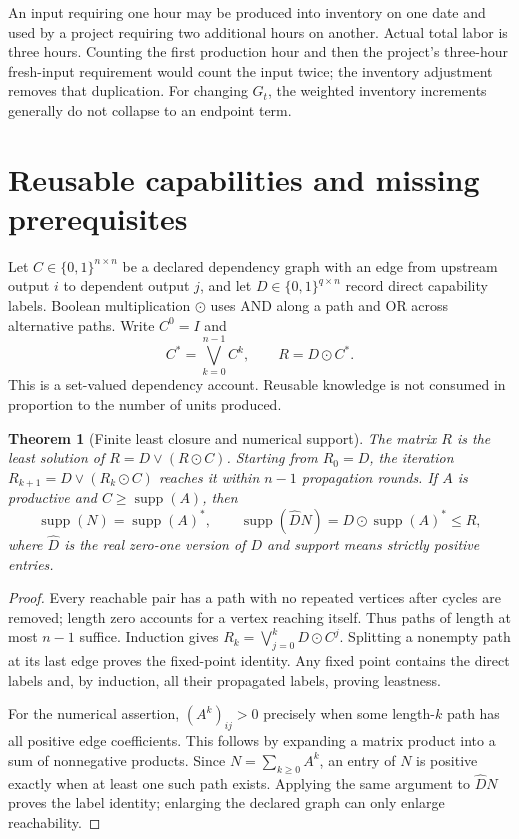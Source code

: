 \documentclass[11pt,a4paper]{article}
\newtheorem{theorem}{Theorem}[section]
\begin{document}
An input requiring one hour may be produced into inventory on one date and used by a project requiring two additional hours on another. Actual total labor is three hours. Counting the first production hour and then the project's three-hour fresh-input requirement would count the input twice; the inventory adjustment removes that duplication. For changing $G_t$, the weighted inventory increments generally do not collapse to an endpoint term.

\section{Reusable capabilities and missing prerequisites}
Let $C\in\{0,1\}^{n\times n}$ be a declared dependency graph with an edge from upstream output $i$ to dependent output $j$, and let $D\in\{0,1\}^{q\times n}$ record direct capability labels. Boolean multiplication $\odot$ uses AND along a path and OR across alternative paths. Write $C^0=I$ and
\begin{equation}
C^*=\bigvee_{k=0}^{n-1}C^k,\qquad R=D\odot C^*.
\end{equation}
This is a set-valued dependency account. Reusable knowledge is not consumed in proportion to the number of units produced.

\begin{theorem}[Finite least closure and numerical support]
The matrix $R$ is the least solution of $R=D\vee(R\odot C)$. Starting from $R_0=D$, the iteration $R_{k+1}=D\vee(R_k\odot C)$ reaches it within $n-1$ propagation rounds. If $A$ is productive and $C\geq\operatorname{supp}(A)$, then
\begin{equation}
\operatorname{supp}(N)=\operatorname{supp}(A)^*,\qquad
\operatorname{supp}(\widehat D N)
=D\odot\operatorname{supp}(A)^*\leq R,
\end{equation}
where $\widehat D$ is the real zero-one version of $D$ and support means strictly positive entries.
\end{theorem}
\begin{proof}
Every reachable pair has a path with no repeated vertices after cycles are removed; length zero accounts for a vertex reaching itself. Thus paths of length at most $n-1$ suffice. Induction gives $R_k=\bigvee_{j=0}^{k}D\odot C^j$. Splitting a nonempty path at its last edge proves the fixed-point identity. Any fixed point contains the direct labels and, by induction, all their propagated labels, proving leastness.

For the numerical assertion, $(A^k)_{ij}>0$ precisely when some length-$k$ path has all positive edge coefficients. This follows by expanding a matrix product into a sum of nonnegative products. Since $N=\sum_{k\geq0}A^k$, an entry of $N$ is positive exactly when at least one such path exists. Applying the same argument to $\widehat D N$ proves the label identity; enlarging the declared graph can only enlarge reachability.
\end{proof}
\end{document}
